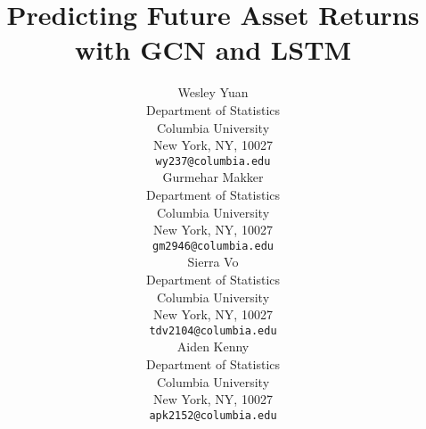 \title{Predicting Future Asset Returns with GCN and LSTM} %
\author{%
  Wesley Yuan \\
  Department of Statistics \\
  Columbia University \\
  New York, NY, 10027 \\
  \texttt{wy237@columbia.edu} \\
  \And
  Gurmehar Makker \\
  Department of Statistics \\
  Columbia University \\
  New York, NY, 10027 \\
  \texttt{gm2946@columbia.edu} \\
  \And
  Sierra Vo \\
  Department of Statistics \\
  Columbia University \\
  New York, NY, 10027 \\
  \texttt{tdv2104@columbia.edu} \\
  \And
  Aiden Kenny \\
  Department of Statistics \\
  Columbia University \\
  New York, NY, 10027 \\
  \texttt{apk2152@columbia.edu} \\
}

\maketitle